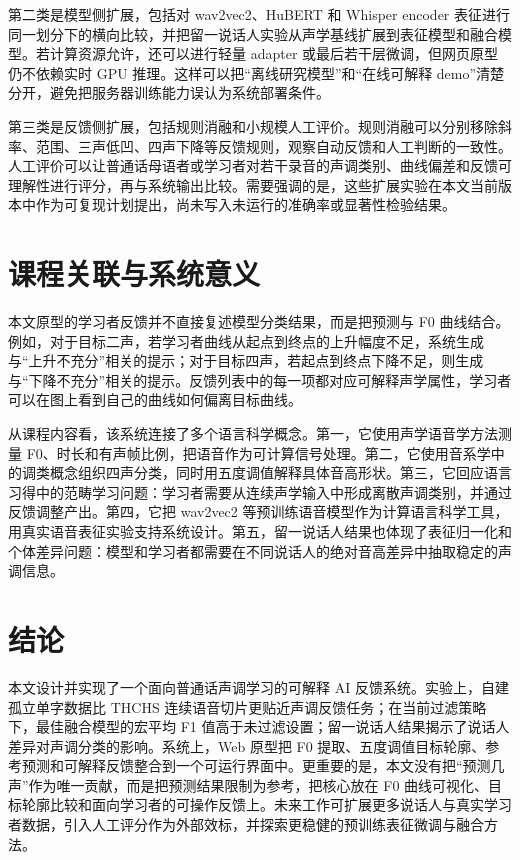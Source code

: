 \documentclass[UTF8,a4paper,twocolumn]{ctexart}
\begin{document}
第二类是模型侧扩展，包括对 wav2vec2、HuBERT 和 Whisper encoder 表征进行同一划分下的横向比较，并把留一说话人实验从声学基线扩展到表征模型和融合模型。若计算资源允许，还可以进行轻量 adapter 或最后若干层微调，但网页原型仍不依赖实时 GPU 推理。这样可以把“离线研究模型”和“在线可解释 demo”清楚分开，避免把服务器训练能力误认为系统部署条件。

第三类是反馈侧扩展，包括规则消融和小规模人工评价。规则消融可以分别移除斜率、范围、三声低凹、四声下降等反馈规则，观察自动反馈和人工判断的一致性。人工评价可以让普通话母语者或学习者对若干录音的声调类别、曲线偏差和反馈可理解性进行评分，再与系统输出比较。需要强调的是，这些扩展实验在本文当前版本中作为可复现计划提出，尚未写入未运行的准确率或显著性检验结果。

\section{课程关联与系统意义}

本文原型的学习者反馈并不直接复述模型分类结果，而是把预测与 F0 曲线结合。例如，对于目标二声，若学习者曲线从起点到终点的上升幅度不足，系统生成与“上升不充分”相关的提示；对于目标四声，若起点到终点下降不足，则生成与“下降不充分”相关的提示。反馈列表中的每一项都对应可解释声学属性，学习者可以在图上看到自己的曲线如何偏离目标曲线。

从课程内容看，该系统连接了多个语言科学概念。第一，它使用声学语音学方法测量 F0、时长和有声帧比例，把语音作为可计算信号处理。第二，它使用音系学中的调类概念组织四声分类，同时用五度调值解释具体音高形状。第三，它回应语言习得中的范畴学习问题：学习者需要从连续声学输入中形成离散声调类别，并通过反馈调整产出。第四，它把 wav2vec2 等预训练语音模型作为计算语言科学工具，用真实语音表征实验支持系统设计。第五，留一说话人结果也体现了表征归一化和个体差异问题：模型和学习者都需要在不同说话人的绝对音高差异中抽取稳定的声调信息。

\section{结论}

本文设计并实现了一个面向普通话声调学习的可解释 AI 反馈系统。实验上，自建孤立单字数据比 THCHS 连续语音切片更贴近声调反馈任务；在当前过滤策略下，最佳融合模型的宏平均 F1 值高于未过滤设置；留一说话人结果揭示了说话人差异对声调分类的影响。系统上，Web 原型把 F0 提取、五度调值目标轮廓、参考预测和可解释反馈整合到一个可运行界面中。更重要的是，本文没有把“预测几声”作为唯一贡献，而是把预测结果限制为参考，把核心放在 F0 曲线可视化、目标轮廓比较和面向学习者的可操作反馈上。未来工作可扩展更多说话人与真实学习者数据，引入人工评分作为外部效标，并探索更稳健的预训练表征微调与融合方法。
\end{document}
